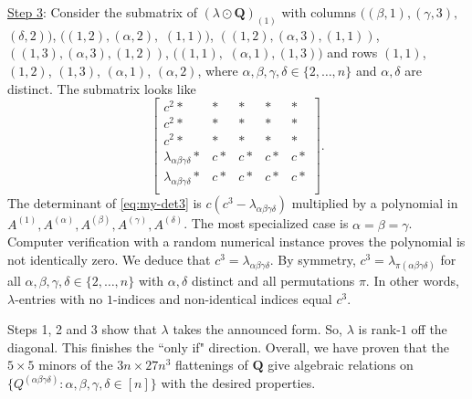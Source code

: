 \documentclass[11pt]{amsart}
\begin{document}
\underline{Step 3}:
Consider  the submatrix of $(\lambda \odot \mathbf{Q})_{(1)}$ with columns 
$((\beta,1),(\gamma,3),$ $(\delta, 2))$, 
$((1,2),(\alpha,2),$ $(1,1))$,
$((1,2),(\alpha,3),(1,1))$,
$((1,3),(\alpha,3),(1,2))$,
$((1,1),$ $(\alpha,1),(1,3))$
and rows 
$(1,1)$,
$(1,2)$,
$(1,3)$,
$(\alpha,1)$,
$(\alpha,2)$, 
where $\alpha, \beta, \gamma, \delta \in \{2, \ldots, n\}$ and $\alpha, \delta$ are distinct.
The submatrix looks like 
\begin{equation} \label{eq:my-det3}
\begin{bmatrix}
c^2\ast & \ast & \ast & \ast & \ast \\
c^2\ast & \ast & \ast & \ast & \ast \\
c^2\ast & \ast & \ast & \ast & \ast \\
\lambda_{\alpha \beta \gamma \delta}\ast & c\ast & c\ast & c\ast & c\ast \\
\lambda_{\alpha \beta \gamma \delta}\ast & c\ast & c\ast & c\ast & c\ast \\
\end{bmatrix}.
\end{equation}
The determinant of \eqref{eq:my-det3} is $c(c^3 - \lambda_{\alpha \beta \gamma \delta})$ multiplied by a polynomial in $A^{(1)}, A^{(\alpha)}, A^{(\beta)}, A^{(\gamma)}, A^{(\delta)}$.
The most specialized case is $\alpha=\beta=\gamma$.  Computer verification with a random numerical instance proves the polynomial is not identically zero.
We deduce that $c^3 = \lambda_{\alpha \beta \gamma \delta}$.  
By symmetry, $c^3 = \lambda_{\pi(\alpha \beta \gamma \delta)}$ for all $\alpha, \beta, \gamma, \delta \in \{2, \dots, n\}$ with $\alpha, \delta$  distinct and all permutations $\pi$.
In other words, $\lambda$-entries with no $1$-indices and non-identical indices equal $c^3$.  

\medskip

Steps 1, 2 and 3 show that  $\lambda$ takes the announced form.  So, $\lambda$ is rank-$1$ off the diagonal.  
This finishes the ``only if" direction.
Overall, we have proven that the $5 \times 5$ minors of the $3n \times 27n^3$ flattenings of $\mathbf{Q}$ give algebraic relations on $\{Q^{(\alpha \beta \gamma \delta)} : \alpha, \beta, \gamma, \delta \in [n] \}$ with the desired \nolinebreak properties.
\end{document}
